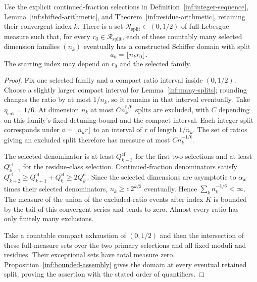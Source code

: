 \begin{corollary}\label{inf:fixed-ratio}
Use the explicit continued-fraction selections in
Definition~\ref{inf:integer-sequence}, Lemma~\ref{inf:shifted-arithmetic}, and
Theorem~\ref{inf:residue-arithmetic}, retaining their convergent
index $k$. There is a set $\mathcal R_{\mathrm{split}}\subset(0,1/2)$
of full Lebesgue measure such that, for every
$r_0\in\mathcal R_{\mathrm{split}}$, each of these countably many
selected dimension families $(n_k)$ eventually has a constructed
Schiffer domain with split
\[
 a_k=\lfloor n_k r_0\rfloor.
\]
The starting index may depend on $r_0$ and the selected family.
\end{corollary}
\begin{proof}
Fix one selected family and a compact ratio interval inside
$(0,1/2)$. Choose a slightly larger compact interval for
Lemma~\ref{inf:many-splits}; rounding changes the ratio by at most
$1/n_k$, so it remains in that interval eventually.
Take $\eta_{\mathrm{cnt}}=1/6$. At dimension $n_k$ at most
$C n_k^{5/6}$ splits are excluded, with $C$ depending on this
family's fixed detuning bound and the compact interval.
Each integer split corresponds under $a=\lfloor n_k r\rfloor$
to an interval of $r$ of length $1/n_k$. The set of ratios giving
an excluded split therefore has measure at most $C n_k^{-1/6}$.

The selected denominator is at least $Q^{\mathrm{cf}}_{k-3}$
for the first two selections and at least $Q^{\mathrm{cf}}_{k-1}$
for the residue-class selection. Continued-fraction denominators
satisfy $Q^{\mathrm{cf}}_{k+2}\ge Q^{\mathrm{cf}}_{k+1}+Q^{\mathrm{cf}}_k
\ge2Q^{\mathrm{cf}}_k$. Since the selected dimensions are asymptotic
to $\alpha_{\mathrm{ar}}$ times their selected denominators,
$n_k\ge c\,2^{k/2}$ eventually. Hence $\sum_k n_k^{-1/6}<\infty$.
The measure of the union of the excluded-ratio events after index
$K$ is bounded by the tail of this convergent series and tends
to zero. Almost every ratio has only finitely many exclusions.

Take a countable compact exhaustion of $(0,1/2)$ and then the
intersection of these full-measure sets over the two primary
selections and all fixed moduli and residues. Their exceptional
sets have total measure zero. Proposition~\ref{inf:bounded-assembly}
gives the domain at every eventual retained split, proving the
assertion with the stated order of quantifiers.
\end{proof}
